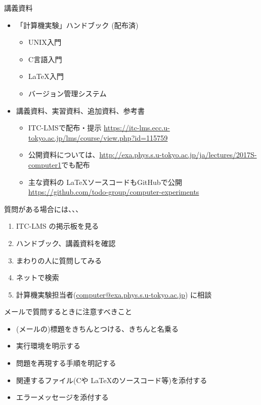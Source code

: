 \begin{frame}[t]{講義資料}
  \begin{itemize}
    \setlength{\itemsep}{1em}
  \item 「計算機実験」ハンドブック (配布済)
    \begin{itemize}
    \item UNIX入門
    \item C言語入門
    \item \LaTeX 入門
    \item バージョン管理システム
    \end{itemize}
  \item 講義資料、実習資料、追加資料、参考書
    \begin{itemize}
    \item ITC-LMSで配布・提示 \url{https://itc-lms.ecc.u-tokyo.ac.jp/lms/course/view.php?id=115759}
    \item 公開資料については、\url{http://exa.phys.s.u-tokyo.ac.jp/ja/lectures/2017S-computer1}でも配布
    \item 主な資料の \LaTeX ソースコードもGitHubで公開 \\
    {\footnotesize \url{https://github.com/todo-group/computer-experiments}}
    \end{itemize}
  \end{itemize}
\end{frame}

\begin{frame}[t]{質問がある場合には、、、}
  \begin{enumerate}
  \item ITC-LMS の掲示板を見る
  \item ハンドブック、講義資料を確認
  \item まわりの人に質問してみる
  \item ネットで検索
  \item 計算機実験担当者(\href{mailto:computer@exa.phys.s.u-tokyo.ac.jp}{computer@exa.phys.s.u-tokyo.ac.jp}) に相談
  \end{enumerate}
  メールで質問するときに注意すべきこと
  \begin{itemize}
  \item (メールの)標題をきちんとつける、きちんと名乗る
  \item 実行環境を明示する
  \item 問題を再現する手順を明記する
  \item 関連するファイル(Cや \LaTeX のソースコード等)を添付する
  \item エラーメッセージを添付する
  \end{itemize}
\end{frame}


